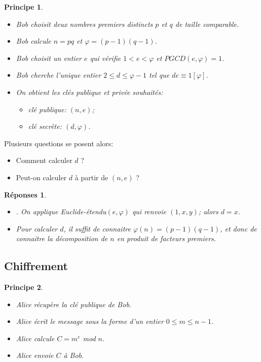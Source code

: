 \documentclass[12pt]{report}
\newtheorem*{reps}{Réponses}
\newtheorem*{prin}{Principe}
\begin{document}
\begin{prin}\
\begin{itemize}
\item[•] Bob choisit deux nombres premiers distincts $p$ et $q$ de taille comparable.
\item[•] Bob calcule $n=pq$ et $\varphi=(p-1)(q-1)$.
\item[•] Bob choisit un entier $e$ qui vérifie $1<e< \varphi$ et $PGCD(e,\varphi)=1$.
\item[•] Bob cherche l'unique entier $2 \leq d \leq \varphi -1$ tel que $de \equiv 1 [\varphi]$.
\item[•] On obtient les clés publique et privée souhaités:
\begin{itemize}
\item[$\star$] clé publique: $(n,e)$;
\item[$\star$] clé secrète: $(d,\varphi)$.
\end{itemize}  
\end{itemize}
\end{prin}

Plusieurs questions se posent alors:
\begin{itemize}
\item[$1)$] Comment calculer $d$ ?
\item[$2)$] Peut-on calculer $d$ à partir de $(n,e)$ ?
\end{itemize}

\begin{reps}
\begin{itemize}
\item[$1)$] . On applique Euclide-étendu$(e,\varphi)$ qui renvoie $(1,x,y)$; alors $d=x$.
\item[$2)$] Pour calculer $d$, il suffit de connaitre $\varphi(n)=(p-1)(q-1)$, et donc de connaitre la décomposition de $n$ en produit de facteurs premiers.
\end{itemize}
\end{reps}

\subsection{Chiffrement}

\begin{prin}\
\begin{itemize}
\item[•] Alice récupère la clé publique de Bob.
\item[•] Alice écrit le message sous la forme d'un entier $0 \leq m \leq n-1$.
\item[•] Alice calcule $C=m^e$ mod $n$.
\item[•] Alice envoie $C$ à Bob.
\end{itemize}
\end{prin}
\end{document}
